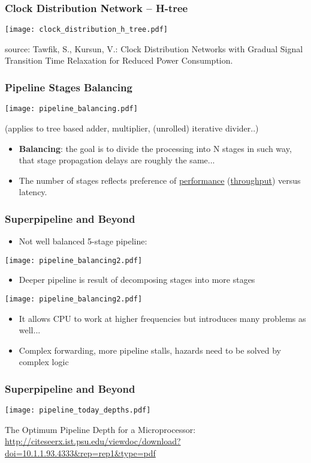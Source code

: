 \documentclass{beamer}
\begin{document}
\begin{frame}
\frametitle{Clock Distribution Network -- H-tree}

{
\centering
\texttt{[image: clock\_distribution\_h\_tree.pdf]}
}

\vskip 2mm

source: Tawfik, S., Kursun, V.: Clock Distribution Networks with Gradual Signal Transition Time Relaxation for Reduced Power Consumption.

\end{frame}

\begin{frame}
\frametitle{Pipeline Stages Balancing}
\texttt{[image: pipeline\_balancing.pdf]}

(applies to tree based adder, multiplier, (unrolled) iterative divider..)

\begin{itemize}
 \item \textbf{Balancing}: the goal is to divide the processing into N stages in such way, that stage propagation delays are roughly the same...
 \item The number of stages reflects preference of \underline{performance} (\underline{throughput}) versus latency.
\end{itemize}

\end{frame}

\begin{frame}
\frametitle{Superpipeline and Beyond}

\begin{itemize}
 \item Not well balanced 5-stage pipeline:
\end{itemize}

\texttt{[image: pipeline\_balancing2.pdf]}

\begin{itemize}
 \item Deeper pipeline is result of decomposing stages into more stages
\end{itemize}

\texttt{[image: pipeline\_balancing2.pdf]}

\begin{itemize}
 \item It allows CPU to work at higher frequencies but introduces many problems as well...
 \item Complex forwarding, more pipeline stalls, hazards need to be solved by complex logic
\end{itemize}

\end{frame}

\begin{frame}
\frametitle{Superpipeline and Beyond}

\texttt{[image: pipeline\_today\_depths.pdf]}

The Optimum Pipeline Depth for a Microprocessor: {\tiny \url{http://citeseerx.ist.psu.edu/viewdoc/download?doi=10.1.1.93.4333&rep=rep1&type=pdf}}

\end{frame}
\end{document}
